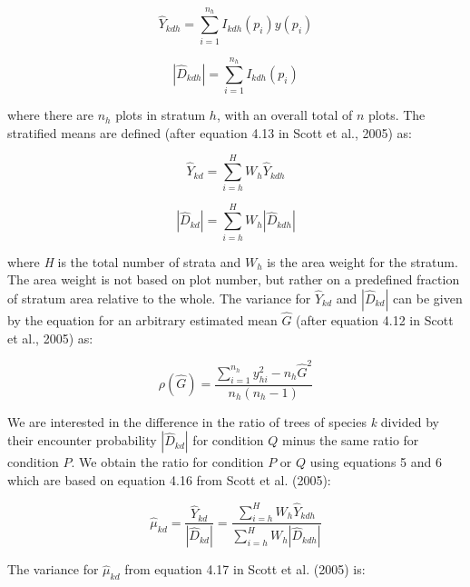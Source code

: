 \documentclass[12pt]{article}
\begin{document}
\begin{equation}
\hat{Y}_{kdh} = \displaystyle\sum_{i=1}^{n_h} I_{kdh}(p_i)y(p_i)  
\end{equation} 

\begin{equation}
|\hat{D}_{kdh}| = \displaystyle\sum_{i=1}^{n_h} I_{kdh}(p_i)
\end{equation} 

where there are $n_h$ plots in stratum $h$, with an overall total of $n$ plots.  The stratified means are defined (after equation 4.13 in Scott et al., 2005) as: 

 \begin{equation} \label{eq:hatY}
\hat{Y}_{kd} = \displaystyle\sum_{i=h}^{H} W_h \hat{Y}_{kdh}
\end{equation} 

\begin{equation}  \label{eq:hatD}
|\hat{D}_{kd}| = \displaystyle\sum_{i=h}^{H} W_h |\hat{D}_{kdh}|
\end{equation} 

where \emph{H} is the total number of strata and $W_h$ is the area weight for the stratum. The area weight is not based on plot number, but rather on a predefined fraction of stratum area relative to the whole.  The variance for $\hat{Y}_{kd}$ and $|\hat{D}_{kd}|$ can be given by the equation for an arbitrary estimated mean $\hat{G}$ (after equation 4.12 in Scott et al., 2005) as:

\begin{equation}
\rho(\hat{G}) = \frac{\displaystyle\sum_{i=1}^{n_h}y^2_{hi} - n_h\hat{G}^2}{n_h(n_h - 1)}
\end{equation}



We are interested in the difference in the ratio of trees of species \emph{k} divided by their encounter probability $|\hat{D}_{kd}|$ for condition $Q$ minus the same ratio for condition $P$.  We obtain the ratio for condition $P$ or $Q$ using equations 5 and 6 which are based on equation 4.16 from Scott et al. (2005):


 \begin{equation}  \label{eq:hatMu}
\hat{\mu}_{kd} = \frac{\hat{Y}_{kd}}{|\hat{D}_{kd}|} = \frac{\displaystyle\sum_{i=h}^{H} W_h \hat{Y}_{kdh}}{ \displaystyle\sum_{i=h}^{H} W_h |\hat{D}_{kdh}|}
\end{equation}
 
The variance for $\hat{\mu}_{kd}$ from equation 4.17 in Scott et al. (2005) is:
\end{document}
